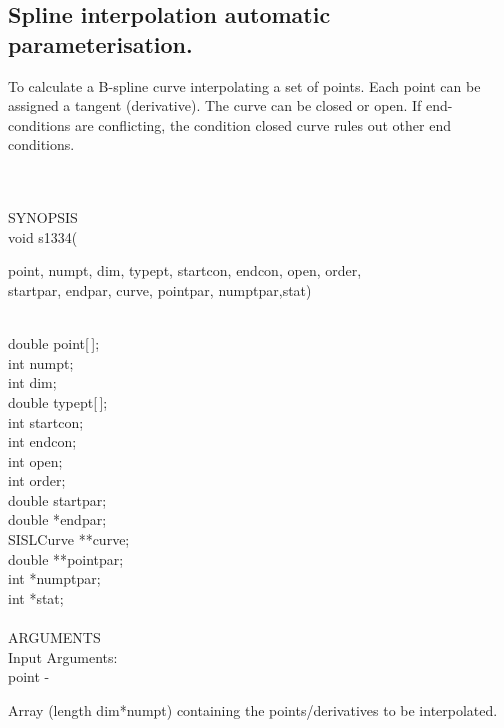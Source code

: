 \subsection{Spline interpolation automatic paramete\-risation.}
\begin{minipg1}
To calculate a B-spline curve interpolating a set of points. Each
point can be assigned a tangent (derivative). The curve can be closed
or open. If end-conditions are conflicting, the condition closed curve
rules out other end conditions.
\end{minipg1} \\ \\
SYNOPSIS\\
	\>void s1334(\begin{minipg3}
		{\fov point}, {\fov numpt}, {\fov dim}, {\fov typept}, {\fov startcon}, {\fov endcon},
		{\fov open}, {\fov order},\\ {\fov startpar}, {\fov endpar}, {\fov curve}, {\fov pointpar},
		{\fov numptpar},{\fov stat})
		\end{minipg3}\\[0.3ex]
		\>\>	double	\> 	{\fov point}[\,];\\
		\>\>	int 	\>	{\fov numpt};\\
		\>\>	int 	\>	{\fov dim};\\
		\>\>	double 	\>	{\fov typept}[\,];\\
		\>\>	int 	\>	{\fov startcon};\\
		\>\>	int 	\>	{\fov endcon};\\
		\>\>	int 	\>	{\fov open};\\
		\>\>	int 	\>	{\fov order};\\
		\>\>	double 	\>	{\fov startpar};\\
		\>\>	double 	\>	*{\fov endpar};\\		
		\>\>	SISLCurve 	\>	**{\fov curve};\\
		\>\>	double 	\>	**{\fov pointpar};\\
		\>\>	int 	\>	*{\fov numptpar};\\
		\>\>	int 	\>	*{\fov stat};\\
\\
ARGUMENTS\\
	\>Input Arguments:\\
	\>\>	{\fov point}	\> - \>	\begin{minipg2}
				Array (length dim*numpt) containing the
				points/derivatives to be interpolated.
				\end{minipg2}\\[0.3ex]
